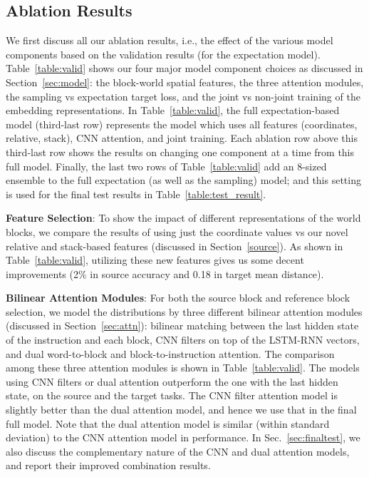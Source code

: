 \documentclass[letterpaper]{article} %
\begin{document}
\subsection{Ablation Results}
\label{sec:val}
We first discuss all our ablation results, i.e., the effect of the various model components based on the validation results (for the expectation model). Table~\ref{table:valid} shows our four major model component choices as discussed in Section~\ref{sec:model}: the block-world spatial features, the three attention modules, the sampling vs expectation target loss, and the joint vs non-joint training of the embedding representations.  In Table~\ref{table:valid}, the full expectation-based model (third-last row) represents the model which uses all features (coordinates, relative, stack), CNN attention, and joint training. Each ablation row above this third-last row shows the results on changing one component at a time from this full model. Finally, the last two rows of Table~\ref{table:valid} add an 8-sized ensemble to the full expectation (as well as the sampling) model; and this setting is used for the final test results in Table~\ref{table:test_result}.

\textbf{Feature Selection}:
To show the impact of different representations of the world blocks, we compare the results of using just the coordinate values vs our novel relative and stack-based features (discussed in Section~\ref{source}).
As shown in Table~\ref{table:valid}, utilizing these new features gives us some decent improvements (2\% in source accuracy and 0.18 in target mean distance).


\textbf{Bilinear Attention Modules}:
For both the source block and reference block selection, we model the distributions by three different bilinear attention modules (discussed in Section~\ref{sec:attn}): bilinear matching between the last hidden state of the instruction and each block, CNN filters on top of the LSTM-RNN vectors, and dual word-to-block and block-to-instruction attention. The comparison among these three attention modules is shown in Table~\ref{table:valid}.
The models using CNN filters or dual attention outperform the one with the last hidden state, on the source and the target tasks. The CNN filter attention model is slightly better than the dual attention model, and hence we use that in the final full model. Note that the dual attention model is similar (within standard deviation) to the CNN attention model in performance. In Sec.~\ref{sec:finaltest}, we also discuss the complementary nature of the CNN and dual attention models, and report their improved combination results.
\end{document}
